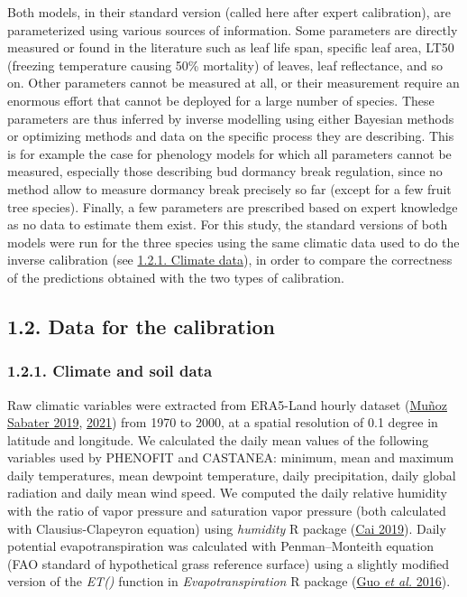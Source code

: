 \documentclass[11pt,]{article}
\begin{document}
Both models, in their standard version (called here after expert
calibration), are parameterized using various sources of information.
Some parameters are directly measured or found in the literature such as
leaf life span, specific leaf area, LT50 (freezing temperature causing
50\% mortality) of leaves, leaf reflectance, and so on. Other parameters
cannot be measured at all, or their measurement require an enormous
effort that cannot be deployed for a large number of species. These
parameters are thus inferred by inverse modelling using either Bayesian
methods or optimizing methods and data on the specific process they are
describing. This is for example the case for phenology models for which
all parameters cannot be measured, especially those describing bud
dormancy break regulation, since no method allow to measure dormancy
break precisely so far (except for a few fruit tree species). Finally, a
few parameters are prescribed based on expert knowledge as no data to
estimate them exist. For this study, the standard versions of both
models were run for the three species using the same climatic data used
to do the inverse calibration (see
\protect\hyperlink{climatedata}{1.2.1. Climate data}), in order to
compare the correctness of the predictions obtained with the two types
of calibration.

\hypertarget{data}{%
\subsection{1.2. Data for the calibration}\label{data}}

\hypertarget{climatedata}{%
\subsubsection{1.2.1. Climate and soil data}\label{climatedata}}

Raw climatic variables were extracted from ERA5-Land hourly dataset
(\protect\hyperlink{ref-Sabater2019}{Muñoz Sabater 2019},
\protect\hyperlink{ref-Sabater2021}{2021}) from 1970 to 2000, at a
spatial resolution of 0.1 degree in latitude and longitude. We
calculated the daily mean values of the following variables used by
PHENOFIT and CASTANEA: minimum, mean and maximum daily temperatures,
mean dewpoint temperature, daily precipitation, daily global radiation
and daily mean wind speed. We computed the daily relative humidity with
the ratio of vapor pressure and saturation vapor pressure (both
calculated with Clausius-Clapeyron equation) using \emph{humidity} R
package (\protect\hyperlink{ref-Cai2019}{Cai 2019}). Daily potential
evapotranspiration was calculated with Penman--Monteith equation (FAO
standard of hypothetical grass reference surface) using a slightly
modified version of the \emph{ET()} function in
\emph{Evapotranspiration} R package (\protect\hyperlink{ref-Guo2016}{Guo
\emph{et al.} 2016}).
\end{document}
